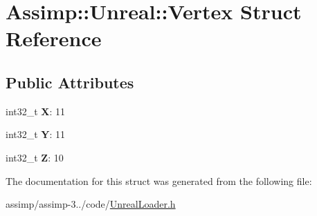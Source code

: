 \hypertarget{struct_assimp_1_1_unreal_1_1_vertex}{\section{Assimp\+:\+:Unreal\+:\+:Vertex Struct Reference}
\label{struct_assimp_1_1_unreal_1_1_vertex}
}
\subsection*{Public Attributes}
\begin{DoxyCompactItemize}
\item 
\hypertarget{struct_assimp_1_1_unreal_1_1_vertex_a97999a8bc8dfab115b28bf1b5b9b21e7}{int32\+\_\+t {\bfseries X}\+: 11}\label{struct_assimp_1_1_unreal_1_1_vertex_a97999a8bc8dfab115b28bf1b5b9b21e7}

\item 
\hypertarget{struct_assimp_1_1_unreal_1_1_vertex_ae0d0b5655baf0bedee4c459f3e704d17}{int32\+\_\+t {\bfseries Y}\+: 11}\label{struct_assimp_1_1_unreal_1_1_vertex_ae0d0b5655baf0bedee4c459f3e704d17}

\item 
\hypertarget{struct_assimp_1_1_unreal_1_1_vertex_a201e07534234155435f5c09921a47186}{int32\+\_\+t {\bfseries Z}\+: 10}\label{struct_assimp_1_1_unreal_1_1_vertex_a201e07534234155435f5c09921a47186}

\end{DoxyCompactItemize}


The documentation for this struct was generated from the following file\+:\begin{DoxyCompactItemize}
\item 
assimp/assimp-\/3../code/\hyperlink{_unreal_loader_8h}{Unreal\+Loader.\+h}\end{DoxyCompactItemize}
